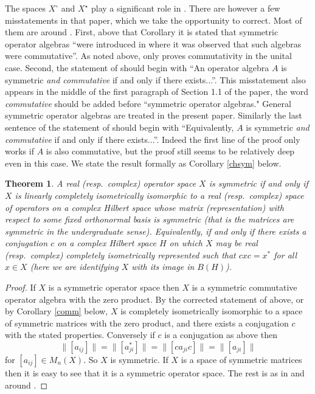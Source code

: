 \documentclass{amsart}
\newtheorem{theorem}{Theorem}[section]
\theoremstyle{remark}
\theoremstyle{definition}
\numberwithin{equation}{section}
\begin{document}
The spaces $X^\circ$ and $X^\star$ play a significant role in \cite{BWinv}. There are however a few misstatements in that paper, which we take the opportunity to correct.   Most of them are around  \cite[Corollary 2.5]{BWinv}.  First, above that Corollary it is stated that symmetric operator algebras ``were introduced in \cite{BComm} where it was observed that such algebras were commutative''.   As noted above, \cite{BComm}  only proves commutativity in the unital case.  
 Second, the statement of \cite[Corollary 2.5]{BWinv} should begin with ``An  operator algebra $A$  is symmetric {\em and commutative} 
 if and only if there exists...''.    This misstatement also appears in the middle of the first paragraph of Section 1.1 of the paper, the word {\em commutative} should be added before 
 ``symmetric operator algebras."  General symmetric operator algebras are treated in the present paper. 
 Similarly the last sentence of the statement of \cite[Corollary 2.5]{BWinv} should begin with ``Equivalently, $A$  is symmetric {\em and commutative}  if and only if there exists...''.   Indeed the first line of the proof only works if $A$ is also commutative, but the proof still seems to be relatively deep even in this case.  We state the result formally as Corollary \ref{chsym} below.  

\begin{theorem} \label{thmsym}  A real  (resp.\ complex)   operator space $X$ is  symmetric if and only if $X$ is linearly completely isometrically isomorphic to a 
real  (resp.\ complex)  space of operators  on a complex Hilbert space 
whose matrix (representation) with respect to some fixed orthonormal basis is 
symmetric (that is the matrices are symmetric in the undergraduate sense).   Equivalently, if and only if  there exists a conjugation $c$ on a complex 
 Hilbert space $H$ on which $X$ may be real  (resp.\ complex)  
 completely isometrically represented such that $c x c = x^*$ for all $x \in X$ (here we are identifying $X$ with its image in $B(H)$). 
\end{theorem}

 \begin{proof}   If $X$ is a symmetric operator space then $X$ is a symmetric commutative 
 operator algebra with the zero product. 
 By the corrected statement of \cite[Corollary 2.5]{BWinv} above, or by Corollary \ref{comm} below, $X$  is completely isometrically isomorphic to a
space of  symmetric matrices with the zero product, and there exists a conjugation $c$ with the stated 
properties.   Conversely if $c$ is a conjugation as above then 
$$\| [a_{ij} ] \| = \| [a_{ji}^* ] \| = \| [ ca_{ji} c ] \| = \| [a_{ji} ] \|$$ 
for $[a_{ij}] \in M_n(X)$.  So $X$ is symmetric. 
If $X$ is a space of symmetric matrices then it is easy to see that it is a symmetric operator space. 
 The rest is as in and around  \cite[Corollary 2.5]{BWinv}. 
\end{proof} 
\end{document}
